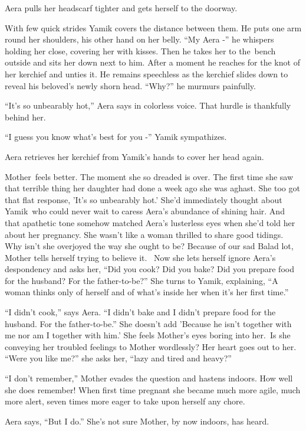 \documentclass[twoside,11pt]{book}
\begin{document}
Aera pulls her headscarf tighter and gets herself to the doorway.

With few quick strides Yamik covers the distance between them. He puts one arm round her shoulders, his other hand on
her belly. ``My Aera -'' he whispers holding her close, covering her with kisses. Then he
takes her to the~bench outside and sits her down next to him. After a moment he reaches for the knot of her kerchief
and unties it. He remains speechless as the kerchief slides down to reveal his beloved{}'s newly shorn head.
``Why?'' he murmurs painfully. 

``It's so unbearably hot,'' Aera says in colorless voice. That hurdle is thankfully behind
her. 

``I guess you know what's best for you -'' Yamik sympathizes. 

Aera retrieves her kerchief from Yamik's hands to cover her head again.\ 

Mother~feels better. The moment she so dreaded is over. The first time she saw that terrible thing her daughter had done
a week ago she was aghast. She too got that flat response, 'It's so unbearably hot.' She'd immediately thought about
Yamik~who could never wait to caress Aera's abundance of shining hair. And that apathetic tone somehow matched Aera's
lusterless eyes when she'd told her about her pregnancy. She wasn't like a woman thrilled to share good tidings. Why
isn't she overjoyed the way she ought to be? Because of our sad Balad lot, Mother tells herself trying to believe it.
\ Now she lets herself ignore Aera's despondency and asks her, ``Did you cook? Did you bake? Did you
prepare food for the husband? For the father-to-be?'' She turns to Yamik, explaining, ``A
woman thinks only of herself and of what's inside her when it's her first time.''

``I didn't cook,'' says Aera. ``I didn't bake and I didn't prepare food for the
husband. For the father-to-be.'' She doesn't add 'Because he isn't together with me nor am I together with
him.{}' She feels Mother's eyes boring into her.\ Is she conveying her troubled feelings to Mother wordlessly? Her
heart goes out to her. ``Were you like me?'' she asks her, ``lazy and tired and heavy?'' 

``I don't remember,'' Mother evades the question and hastens indoors. How well she does
remember! When first time pregnant she became much more agile, much more alert, seven times more eager to take upon
herself any chore.~~~ 

Aera says, ``But I do.'' She's not sure Mother, by now indoors, has heard. 
\end{document}
